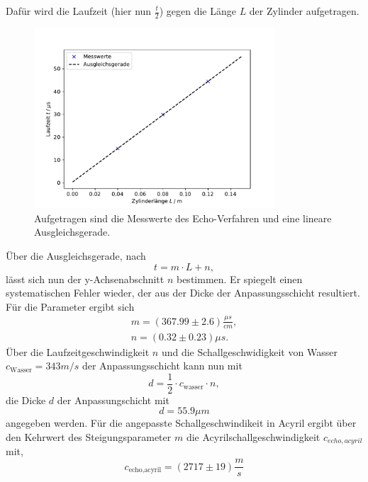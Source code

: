 Dafür wird die Laufzeit (hier nun $\frac{t}{2}$) gegen die Länge $L$ der Zylinder aufgetragen.
\begin{figure}[H]
    \centering
    \includegraphics[width=0.8\textwidth]{plots/laufzeit_echo.pdf}
    \caption{Aufgetragen sind die Messwerte des Echo-Verfahren und eine lineare
    Ausgleichsgerade.}
\end{figure}
Über die Ausgleichsgerade, nach
\begin{equation}
    t=m \cdot L+n,
\end{equation}
lässt sich nun der y-Achsenabschnitt $n$ bestimmen.
Er spiegelt einen systematischen Fehler wieder, der aus der Dicke der Anpassungsschicht
resultiert.\\ 
Für die Parameter ergibt sich
\begin{align*}
    m=(367.99\pm2.6)\frac{\mu s}{cm},\\
    n=(0.32\pm0.23)\mu s.
\end{align*}
Über die Laufzeitgeschwindigkeit $n$ und die Schallgeschwidigkeit von Wasser
$c_{\text{Wasser}}=343m/s$ der Anpassungsschicht kann nun mit
\begin{equation}
    d=\frac{1}{2} \cdot c_{\text{wasser}} \cdot n,
\end{equation}
die Dicke $d$ der Anpassungschicht mit
\begin{equation}
    d=55.9\mu m
\end{equation}
angegeben werden.
Für die angepasste Schallgeschwindikeit in Acyril ergibt über den 
Kehrwert des Steigungsparameter $m$ die Acyrilschallgeschwindigkeit $c_{echo,acyril}$ mit,
\begin{equation}
    c_{\text{echo,acyril}}=(2717\pm19)\frac{m}{s}
\end{equation}

